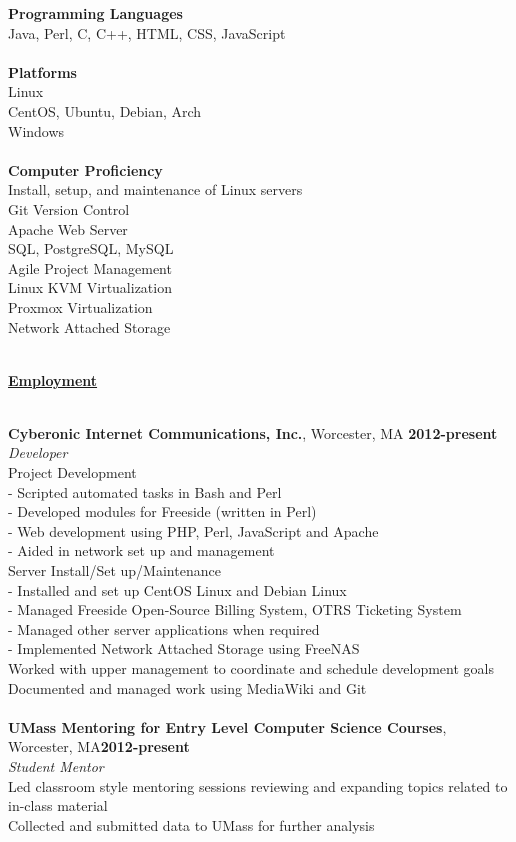 \documentclass[10pt,notitlepage]{article}
\newenvironment{area}
	{
		\vspace{1em}
		\fontfamily{\sfdefault}\selectfont\begin{singlespace}
	}
	{\\\hrulefill\end{singlespace}\par}
\newcommand{\areaName}[1]{
	\noindent \uline{\hfill\phantom{.}}\\
	\uline{\phantom{.}\hfill{\Large\textbf{#1}}\hfill\phantom{.}}\\
}
\newcommand{\B}[1]{\textbf{#1}}
\newcommand{\I}[1]{\textit{#1}}
\begin{document}
\noindent \B{Programming Languages} \\
\indent Java, Perl, C, C++, HTML, CSS, JavaScript\\\\
\noindent \B{Platforms} \\
\indent Linux \\
\indent \indent CentOS, Ubuntu, Debian, Arch \\
\indent Windows \\\\
\noindent \B{Computer Proficiency} \\
	\indent Install, setup, and maintenance of Linux servers \\
	\indent Git Version Control \\
	\indent Apache Web Server \\
	\indent SQL, PostgreSQL, MySQL \\
	\indent Agile Project Management \\
	\indent Linux KVM Virtualization \\
	\indent Proxmox Virtualization \\
	\indent Network Attached Storage

\begin{area}
	\areaName{Employment}
\end{area}
\noindent \B{Cyberonic Internet Communications, Inc.}, Worcester, MA
\hfill\B{2012-present}\\
\I{Developer}\\
\indent Project Development\\
	\indent \indent - Scripted automated tasks in Bash and Perl\\
	\indent \indent - Developed modules for Freeside (written in Perl)\\
	\indent \indent - Web development using PHP, Perl, JavaScript and Apache\\
	\indent \indent - Aided in network set up and management\\
\indent Server Install/Set up/Maintenance\\
	\indent \indent - Installed and set up CentOS Linux and Debian Linux\\
	\indent \indent - Managed Freeside Open-Source Billing System, OTRS
	Ticketing System\\
	\indent \indent - Managed other server applications when required\\
	\indent \indent - Implemented Network Attached Storage using FreeNAS\\
\indent Worked with upper management to coordinate and schedule development
goals\\
\indent Documented and managed work using MediaWiki and Git\\\\
\noindent \B{UMass Mentoring for Entry Level Computer Science Courses}, Worcester,
MA\hfill\B{2012-present}\\
\I{Student Mentor}\\
\indent Led classroom style mentoring sessions reviewing and expanding topics related
to in-class material\\
\indent Collected and submitted data to UMass for further analysis\\\\
\end{document}
